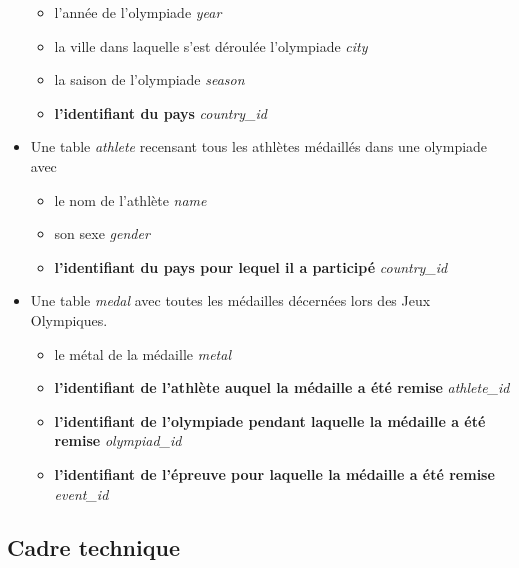\documentclass{article}
\begin{document}
\begin{itemize}
\begin{itemize}
\item l'année de l'olympiade \textit{year}

\item la ville dans laquelle s'est déroulée l'olympiade \textit{city}

\item la saison de l'olympiade \textit{season}

\item \textbf{l'identifiant du pays} \textit{country\_id}

\end{itemize}

\item
Une table \textit{athlete} recensant tous les athlètes médaillés dans une olympiade avec

\begin{itemize}

\item le nom de l'athlète \textit{name}

\item son sexe \textit{gender}

\item \textbf{l'identifiant du pays pour lequel il a participé} \textit{country\_id}

\end{itemize}

\item
Une table \textit{medal} avec toutes les médailles décernées lors des Jeux Olympiques.

\begin{itemize}

\item le métal de la médaille \textit{metal}

\item \textbf{l'identifiant de l'athlète auquel la médaille a été remise} \textit{athlete\_id}

\item \textbf{l'identifiant de l'olympiade pendant laquelle la médaille a été remise} \textit{olympiad\_id}

\item \textbf{l'identifiant de l'épreuve pour laquelle la médaille a été remise} \textit{event\_id}

\end{itemize}

\end{itemize}

\subsection{Cadre technique}
\end{document}
